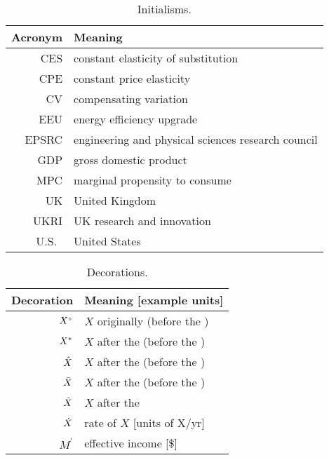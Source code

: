 
\begin{table}
\footnotesize
\centering %
\caption{Initialisms.}
\begin{tabular}{r l}
  \toprule
  Acronym & Meaning \\
  \midrule
  CES    & constant elasticity of substitution \\
  CPE    & constant price elasticity \\
  CV     & compensating variation \\
  EEU    & energy efficiency upgrade \\
  EPSRC  & engineering and physical sciences research council \\
  GDP    & gross domestic product \\
  MPC    & marginal propensity to consume \\
  UK     & United Kingdom \\
  UKRI   & UK research and innovation \\
  U.S.\  & United States \\
  \bottomrule
\end{tabular}
\label{tab:initialisms}
\end{table}



\begin{table}
\footnotesize
\centering %
\caption{Decorations.}
\begin{tabular}{r l}
  \toprule
  Decoration & Meaning [example units] \\
  \midrule
  ${}{X}^{\scriptscriptstyle \circ}$ & $X$ originally (before the \empleffect{}) \\
  ${X}^*$  & $X$ after the \empleffect{} (before the \subeffect{}) \\
  $\hat{X}$ & $X$ after the \subeffect{} (before the \inceffect{}) \\
  $\bar{X}$ & $X$ after the \inceffect{} (before the \macroeffect{}) \\
  $\tilde{X}$ & $X$ after the \macroeffect{} \\
  $\dot{X}$ & rate of $X$ [units of X/yr] \\
  $M^\prime$ & effective income [\$] \\
  \bottomrule
\end{tabular}
\label{tab:decorations}
\end{table}



